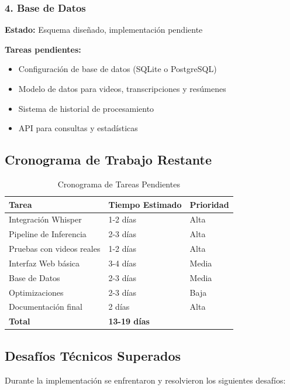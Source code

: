 \documentclass[12pt,a4paper]{article}
\begin{document}
\subsubsection{4. Base de Datos}

\textbf{Estado:} Esquema diseñado, implementación pendiente

\textbf{Tareas pendientes:}
\begin{itemize}
    \item Configuración de base de datos (SQLite o PostgreSQL)
    \item Modelo de datos para videos, transcripciones y resúmenes
    \item Sistema de historial de procesamiento
    \item API para consultas y estadísticas
\end{itemize}

\newpage

\subsection{Cronograma de Trabajo Restante}

\begin{table}[H]
\centering
\begin{tabular}{lll}
\toprule
\textbf{Tarea} & \textbf{Tiempo Estimado} & \textbf{Prioridad} \\
\midrule
Integración Whisper & 1-2 días & Alta \\
Pipeline de Inferencia & 2-3 días & Alta \\
Pruebas con videos reales & 1-2 días & Alta \\
Interfaz Web básica & 3-4 días & Media \\
Base de Datos & 2-3 días & Media \\
Optimizaciones & 2-3 días & Baja \\
Documentación final & 2 días & Alta \\
\midrule
\textbf{Total} & \textbf{13-19 días} & \\
\bottomrule
\end{tabular}
\caption{Cronograma de Tareas Pendientes}
\label{tab:cronograma}
\end{table}

\subsection{Desafíos Técnicos Superados}

Durante la implementación se enfrentaron y resolvieron los siguientes desafíos:
\end{document}
